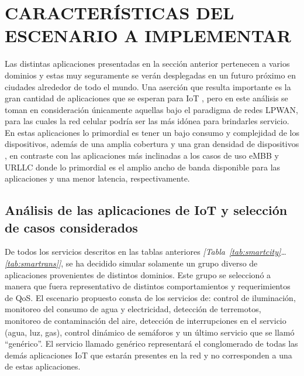 
\section{CARACTERÍSTICAS DEL ESCENARIO A IMPLEMENTAR}

Las distintas aplicaciones presentadas en la sección anterior pertenecen a varios dominios y estas muy seguramente se verán desplegadas en un futuro próximo en ciudades alrededor de todo el mundo. Una aserción que resulta importante es la gran cantidad de aplicaciones que se esperan para IoT \parencite{Ericsson2019}, pero en este análisis se toman en consideración únicamente aquellas bajo el paradigma de redes LPWAN, para las cuales la red celular podría ser las más idónea para brindarles servicio. En estas aplicaciones lo primordial es tener un bajo consumo y complejidad de los dispositivos, además de una amplia cobertura y una gran densidad de dispositivos \parencite{5GAmericas}, en contraste con las aplicaciones más inclinadas a los casos de uso eMBB y URLLC donde lo primordial es el amplio ancho de banda disponible para las aplicaciones y una menor latencia, respectivamente.\newline

\subsection{Análisis de las aplicaciones de IoT y selección de casos considerados}

De todos los servicios descritos en las tablas anteriores \textit{[Tabla~\ref{tab:smartcity}\ldots \ref{tab:smartrans}]}, se ha decidido simular solamente un grupo diverso de aplicaciones provenientes de distintos dominios. Este grupo se seleccionó a manera que fuera representativo de distintos comportamientos y requerimientos de QoS. El escenario propuesto consta de los servicios de: control de iluminación, monitoreo del consumo de agua y electricidad, detección de terremotos, monitoreo de contaminación del aire, detección de interrupciones en el servicio (agua, luz, gas), control dinámico de semáforos y un último servicio que se llamó ``genérico''. El servicio llamado genérico representará el conglomerado de todas las demás aplicaciones IoT que estarán presentes en la red y no corresponden a una de estas aplicaciones. \newline

